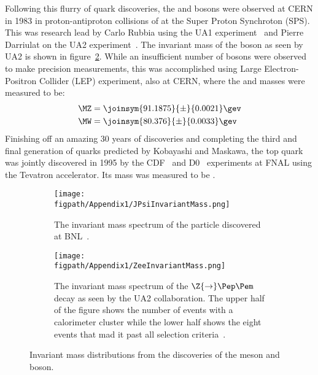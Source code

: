 Following this flurry of quark discoveries, the \W and \Z bosons were observed at CERN in 1983 in proton-antiproton collisions of \gev at the Super Proton Synchroton (SPS).
This was research lead by Carlo Rubbia using the UA1 experiment~\cite{1983398} and Pierre Darriulat on the UA2 experiment~\cite{BAGNAIA1983130}.
The invariant mass of the \Z boson as seen by UA2 is shown in figure~\ref{fig:ZeeInvariantMass}.
While an insufficient number of \W bosons were observed to make precision measurements, this was accomplished using Large Electron-Positron Collider (LEP) experiment, also at CERN, where the \W and \Z masses were measured to be:
\begin{align}
\begin{split}
	\MZ &= \joinsym{91.1875}{\pm}{0.0021}\gev\\
	\MW &= \joinsym{80.376}{\pm}{0.0033}\gev
\end{split}
\end{align}
Finishing off an amazing 30 years of discoveries and completing the third and final generation of quarks predicted by Kobayashi and Maskawa, the top quark was jointly discovered in 1995 by the CDF~\cite{PhysRevLett.74.2626} and D0~\cite{PhysRevLett.74.2422} experiments at FNAL using the \tev Tevatron accelerator.
Its mass was measured to be \gev.

\begin{figure}[!hbt]
    \centering
    \begin{subfigure}[t]{0.48\textwidth}
        \texttt{[image: \\figpath/Appendix1/JPsiInvariantMass.png]}
        \caption{The invariant mass spectrum of the \JPsi particle discovered at BNL~\cite{PhysRevLett.33.1404}.}
        \label{fig:JPsiInvariantMass}
    \end{subfigure}
    \begin{subfigure}[t]{0.48\textwidth}
        \texttt{[image: \\figpath/Appendix1/ZeeInvariantMass.png]}
        \caption{The invariant mass spectrum of the $\Z{\rightarrow}\Pep\Pem$ decay as seen by the UA2 collaboration. The upper half of the figure shows the number of events with a calorimeter cluster while the lower half shows the eight events that mad it past all selection criteria~\cite{BAGNAIA1983130}.}
        \label{fig:ZeeInvariantMass}
    \end{subfigure}
    \caption{Invariant mass distributions from the discoveries of the \JPsi meson and \Z boson.}
    \label{fig:JPsiAndZ}
\end{figure}

